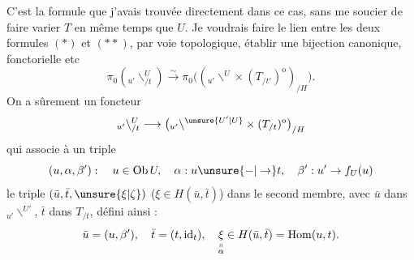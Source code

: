 C'est la formule que j'avais trouvée directement
dans ce cas, sans me soucier  de faire varier $T$
en même temps que $U$. Je voudrais faire le
lien entre les deux formules $(*)$ et $(**)$, par
voie topologique,  établir une bijection
canonique, fonctorielle etc
\[
\pi_0({}_{u'}\backslash^{U}_{/t})\mathrel{\overset{\sim}{\longrightarrow}}
\pi_0\bigl(({}_{u'}\backslash^{U}\times(T_{/t'})^{\mathrm o})_{/H}\bigr).
\]
On a sûrement un foncteur
\[
{}_{u'}\backslash^{U}_{/t}\longrightarrow
\bigl({}_{u'}\backslash^{\unsure{U'|U}}\times(T_{/t})^{\mathrm o}\bigr)_{/H}
\]
qui associe à un triple
\[
(u,\alpha,\beta'):\quad u\in\operatorname{Ob}U,\quad\alpha:u\unsure{-|\to}t,\quad
\beta':u'\to f_U(u)
\]
le triple $(\bar u,\bar t,\unsure{\xi|\zeta})$ ($\xi\in H(\bar u,\bar t)$)  dans
le second membre, avec $\bar u$ dans $\mathord{}_{u'}\backslash^{U'}$, $\bar t$ dans $T_{/t}$,
défini ainsi :
\[
\bar u=(u,\beta'),\quad \bar t=(t,\mathrm{id}_t),\quad
\underset{\substack{\shortparallel\\\alpha}}{\xi}\in H(\bar u,\bar t)=\operatorname{Hom}(u,t).
\]

